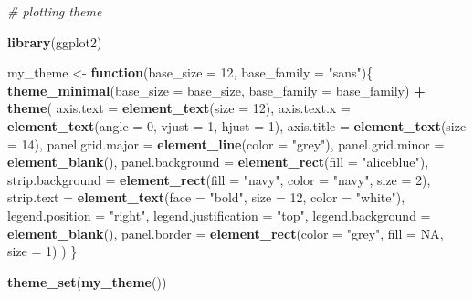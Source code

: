 \documentclass[]{article}
\newenvironment{Shaded}{\begin{snugshade}}{\end{snugshade}}
\newcommand{\KeywordTok}[1]{\textcolor[rgb]{0.13,0.29,0.53}{\textbf{#1}}}
\newcommand{\DataTypeTok}[1]{\textcolor[rgb]{0.13,0.29,0.53}{#1}}
\newcommand{\DecValTok}[1]{\textcolor[rgb]{0.00,0.00,0.81}{#1}}
\newcommand{\StringTok}[1]{\textcolor[rgb]{0.31,0.60,0.02}{#1}}
\newcommand{\CommentTok}[1]{\textcolor[rgb]{0.56,0.35,0.01}{\textit{#1}}}
\newcommand{\OtherTok}[1]{\textcolor[rgb]{0.56,0.35,0.01}{#1}}
\newcommand{\ControlFlowTok}[1]{\textcolor[rgb]{0.13,0.29,0.53}{\textbf{#1}}}
\newcommand{\OperatorTok}[1]{\textcolor[rgb]{0.81,0.36,0.00}{\textbf{#1}}}
\newcommand{\NormalTok}[1]{#1}
\begin{document}
\begin{Shaded}
\begin{Highlighting}[]
\CommentTok{# plotting theme}

\KeywordTok{library}\NormalTok{(ggplot2)}

\NormalTok{my_theme <-}\StringTok{ }\ControlFlowTok{function}\NormalTok{(}\DataTypeTok{base_size =} \DecValTok{12}\NormalTok{, }\DataTypeTok{base_family =} \StringTok{"sans"}\NormalTok{)\{}
  \KeywordTok{theme_minimal}\NormalTok{(}\DataTypeTok{base_size =}\NormalTok{ base_size, }\DataTypeTok{base_family =}\NormalTok{ base_family) }\OperatorTok{+}
\StringTok{  }\KeywordTok{theme}\NormalTok{(}
    \DataTypeTok{axis.text =} \KeywordTok{element_text}\NormalTok{(}\DataTypeTok{size =} \DecValTok{12}\NormalTok{),}
    \DataTypeTok{axis.text.x =} \KeywordTok{element_text}\NormalTok{(}\DataTypeTok{angle =} \DecValTok{0}\NormalTok{, }\DataTypeTok{vjust =} \DecValTok{1}\NormalTok{, }\DataTypeTok{hjust =} \DecValTok{1}\NormalTok{),}
    \DataTypeTok{axis.title =} \KeywordTok{element_text}\NormalTok{(}\DataTypeTok{size =} \DecValTok{14}\NormalTok{),}
    \DataTypeTok{panel.grid.major =} \KeywordTok{element_line}\NormalTok{(}\DataTypeTok{color =} \StringTok{"grey"}\NormalTok{),}
    \DataTypeTok{panel.grid.minor =} \KeywordTok{element_blank}\NormalTok{(),}
    \DataTypeTok{panel.background =} \KeywordTok{element_rect}\NormalTok{(}\DataTypeTok{fill =} \StringTok{"aliceblue"}\NormalTok{),}
    \DataTypeTok{strip.background =} \KeywordTok{element_rect}\NormalTok{(}\DataTypeTok{fill =} \StringTok{"navy"}\NormalTok{, }\DataTypeTok{color =} \StringTok{"navy"}\NormalTok{, }\DataTypeTok{size =} \DecValTok{2}\NormalTok{),}
    \DataTypeTok{strip.text =} \KeywordTok{element_text}\NormalTok{(}\DataTypeTok{face =} \StringTok{"bold"}\NormalTok{, }\DataTypeTok{size =} \DecValTok{12}\NormalTok{, }\DataTypeTok{color =} \StringTok{"white"}\NormalTok{),}
    \DataTypeTok{legend.position =} \StringTok{"right"}\NormalTok{,}
    \DataTypeTok{legend.justification =} \StringTok{"top"}\NormalTok{, }
    \DataTypeTok{legend.background =} \KeywordTok{element_blank}\NormalTok{(),}
    \DataTypeTok{panel.border =} \KeywordTok{element_rect}\NormalTok{(}\DataTypeTok{color =} \StringTok{"grey"}\NormalTok{, }\DataTypeTok{fill =} \OtherTok{NA}\NormalTok{, }\DataTypeTok{size =} \DecValTok{1}\NormalTok{)}
\NormalTok{  )}
\NormalTok{\}}

\KeywordTok{theme_set}\NormalTok{(}\KeywordTok{my_theme}\NormalTok{())}
\end{Highlighting}
\end{Shaded}
\end{document}

